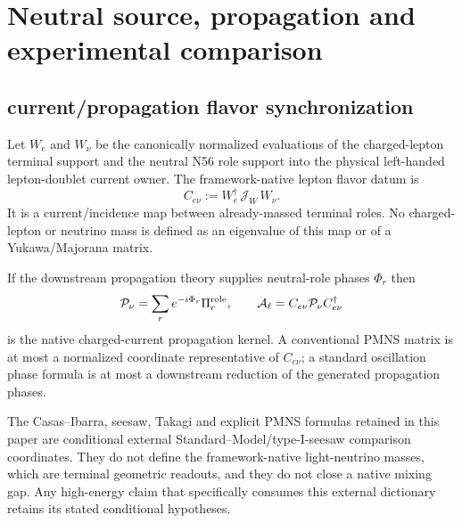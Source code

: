 \documentclass[12pt,a4paper]{article}
\begin{document}





\section{Neutral source, propagation and experimental comparison}
\label{p5c:sec:organized-neutral}
\subsection{current/propagation flavor synchronization}
\label{p7v2:sec:v266-current-propagation-flavor-sync}

\begin{definition}
\label{p7v2:def:v266-lepton-current-map}
Let $W_e$ and $W_\nu$ be the canonically normalized evaluations of the
charged-lepton terminal support and the neutral N56 role support into the
physical left-handed lepton-doublet current owner.  The framework-native
lepton flavor datum is
\[
 \boxed{C_{e\nu}:=W_e^\dagger\,\mathscr J_W\,W_\nu.}
\]
It is a current/incidence map between already-massed terminal roles.  No
charged-lepton or neutrino mass is defined as an eigenvalue of this map or of
a Yukawa/Majorana matrix.
\end{definition}

\begin{proposition}
\label{p7v2:prop:v266-oscillation-current-kernel}
If the downstream propagation theory supplies neutral-role phases $\Phi_r$
then
\[
 \mathcal P_\nu=\sum_r e^{-i\Phi_r}\Pi_r^{\rm role},\qquad
 \mathcal A_\ell=C_{e\nu}\mathcal P_\nu C_{e\nu}^\dagger
\]
is the native charged-current propagation kernel.  A conventional PMNS matrix
is at most a normalized coordinate representative of $C_{e\nu}$; a standard
oscillation phase formula is at most a downstream reduction of the generated
propagation phases.
\end{proposition}

\begin{remark}
The Casas--Ibarra, seesaw, Takagi and explicit PMNS formulas retained in this
paper are conditional external Standard--Model/type-I-seesaw comparison
coordinates.  They do not define the framework-native light-neutrino masses,
which are terminal geometric readouts, and they do not close a native mixing
gap.  Any high-energy claim that specifically consumes this external
dictionary retains its stated conditional hypotheses.
\end{remark}
\end{document}
